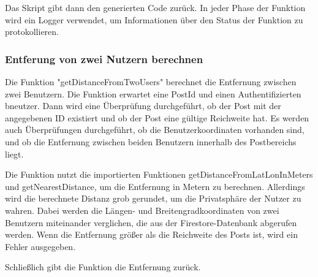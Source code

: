 Das Skript gibt dann den generierten Code zurück. In jeder
Phase der Funktion wird ein Logger verwendet, um
Informationen über den Status der Funktion zu
protokollieren.

\subsubsection{Entferung von zwei Nutzern berechnen}
\author{Martin Hausleitner}
Die Funktion "getDistanceFromTwoUsers" berechnet die
Entfernung zwischen zwei Benutzern. Die Funktion erwartet
eine PostId und einen Authentifizierten bneutzer. Dann wird eine
Überprüfung durchgeführt, ob der Post mit der angegebenen ID
existiert und ob der Post eine gültige Reichweite hat. Es
werden auch Überprüfungen durchgeführt, ob die
Benutzerkoordinaten vorhanden sind, und ob die Entfernung
zwischen beiden Benutzern innerhalb des Postbereichs liegt.

Die Funktion nutzt die importierten Funktionen
getDistanceFromLatLonInMeters und getNearestDistance, um die
Entfernung in Metern zu berechnen. Allerdings wird die
berechnete Distanz grob gerundet, um die Privatsphäre der
Nutzer zu wahren. Dabei
werden die Längen- und Breitengradkoordinaten von zwei
Benutzern miteinander verglichen, die aus der
Firestore-Datenbank abgerufen werden. Wenn die Entfernung
größer als die Reichweite des Posts ist, wird ein Fehler
ausgegeben.

Schließlich gibt die Funktion die Entfernung zurück.

